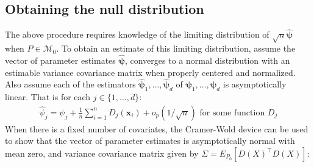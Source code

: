 \documentclass{article}
\newcommand{\rvo}{X}
\newcommand{\disto}{P}
\begin{document}


\subsection{Obtaining the null distribution}
\label{ssec:obtaining_null}
The above procedure requires knowledge of the limiting distribution of $\sqrt{n}\hat{\boldsymbol{\psi}}$ when $P \in \mathscr{M}_0$.  To obtain an estimate of this limiting distribution, assume the vector of parameter estimates $\hat{\boldsymbol{\psi}}$, converges to a normal distribution with an estimable variance covariance matrix when properly centered and normalized. Also assume each of the estimators $\hat{\boldsymbol{\psi}}_1, \dots, \hat{\boldsymbol{\psi}}_d$ of $\boldsymbol{\psi}_1, \dots, \boldsymbol{\psi}_d$ is asymptotically linear.  That is for each $j \in \{1, \dots, d\}$:
\begin{align*}
\hat{\psi}_j = \psi_j + \frac{1}{n}\sum_{i=1}^n D_j(\boldsymbol{x}_i) + o_p(1/\sqrt{n}) \text{ for some function } D_j
\end{align*}
When there is a fixed number of covariates, the Cramer-Wold device can be used to show that the vector of parameter estimates is asymptotically normal with mean zero, and variance covariance matrix given by $\Sigma = E_{\disto_0}\left[D(\rvo)^\top D(\rvo)\right]$:
\end{document}
